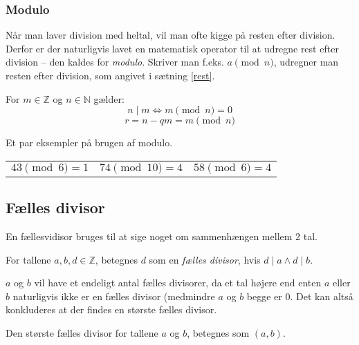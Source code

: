     \subsubsection{Modulo}
    Når man laver division med heltal, vil man ofte kigge på resten efter division.
    Derfor er der naturligvis lavet en matematisk operator til at udregne rest efter division -- den kaldes for \emph{modulo}.
    Skriver man f.eks. \(a \pmod{n}\), udregner man resten efter division, som angivet i sætning \ref{rest}.

    \begin{definition}
        For \(m \in \mathbb{Z}\) og \(n \in \mathbb{N}\) gælder:
        \[n \mid m \iff m \pmod{n} = 0\]
        \[r = n - q m = m \pmod{n}\]\cite[72]{krypto}
    \end{definition}

    \begin{eks}
        Et par eksempler på brugen af modulo.
        \begin{center}
            \setlength{\tabcolsep}{20pt} %
            \begin{tabular}{l c r}
                \(43 \pmod{6} = 1\) & \(74 \pmod{10} = 4\) & \(58 \pmod{6} = 4\)
            \end{tabular}
        \end{center}
    \end{eks}




    \subsection{Fælles divisor}
    En fællesvidisor bruges til at sige noget om sammenhængen mellem 2 tal.

    \begin{definition}
        For tallene \(a, b, d \in \mathbb{Z}\), betegnes \(d\) som en \emph{fælles divisor}, hvis \(d \mid a \land d \mid b\).
    \end{definition}

    \(a\) og \(b\) vil have et endeligt antal fælles divisorer, da et tal højere end enten \(a\) eller \(b\) naturligvis ikke er en fælles divisor (medmindre \(a\) og \(b\) begge er \(0\).
    Det kan altså konkluderes at der findes en største fælles divisor.

    \begin{definition}
        Den største fælles divisor for tallene \(a\) og \(b\), betegnes som \((a,b)\).
    \end{definition}

